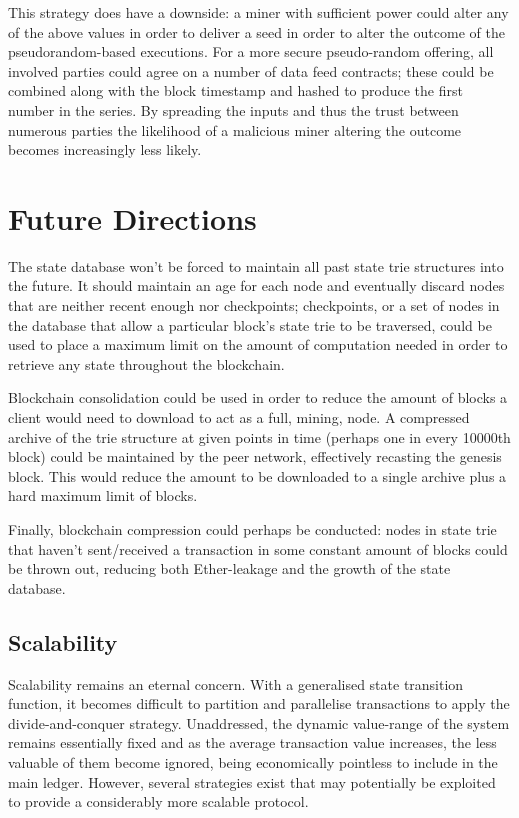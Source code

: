 \documentclass[9pt,oneside]{amsart}
\begin{document}
\begin{multicols}{2}
This strategy does have a downside: a miner with sufficient power could alter any of the above values in order to deliver a seed in order to alter the outcome of the pseudorandom-based executions. For a more secure pseudo-random offering, all involved parties could agree on a number of data feed contracts; these could be combined along with the block timestamp and hashed to produce the first number in the series. By spreading the inputs and thus the trust between numerous parties the likelihood of a malicious miner altering the outcome becomes increasingly less likely.

\section{Future Directions} \label{ch:future}

The state database won't be forced to maintain all past state trie structures into the future. It should maintain an age for each node and eventually discard nodes that are neither recent enough nor checkpoints; checkpoints, or a set of nodes in the database that allow a particular block's state trie to be traversed, could be used to place a maximum limit on the amount of computation needed in order to retrieve any state throughout the blockchain.

Blockchain consolidation could be used in order to reduce the amount of blocks a client would need to download to act as a full, mining, node. A compressed archive of the trie structure at given points in time (perhaps one in every 10000th block) could be maintained by the peer network, effectively recasting the genesis block. This would reduce the amount to be downloaded to a single archive plus a hard maximum limit  of blocks.

Finally, blockchain compression could perhaps be conducted: nodes in state trie that haven't sent/received a transaction in some constant amount of blocks could be thrown out, reducing both Ether-leakage and the growth of the state database.

\subsection{Scalability}

Scalability remains an eternal concern. With a generalised state transition function, it becomes difficult to partition and parallelise transactions to apply the divide-and-conquer strategy. Unaddressed, the dynamic value-range of the system remains essentially fixed and as the average transaction value increases, the less valuable of them become ignored, being economically pointless to include in the main ledger. However, several strategies exist that may potentially be exploited to provide a considerably more scalable protocol.


\end{multicols}
\end{document}
